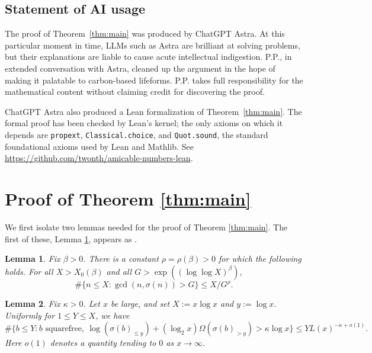 \documentclass[11pt]{amsart}
\newtheorem{lemma}{Lemma}
\begin{document}
\subsection*{Statement of AI usage} The proof of Theorem~\ref{thm:main} was produced by ChatGPT Astra.
At this particular moment in time, LLMs such as Astra are
brilliant at solving problems, but their explanations are liable to
cause acute intellectual indigestion. P.P., in extended conversation with
Astra, cleaned up the argument in the hope of making it
palatable to carbon-based lifeforms. P.P. takes full
responsibility for the mathematical content without claiming
credit for discovering the proof.

ChatGPT Astra also produced a Lean formalization of
Theorem~\ref{thm:main}. The formal proof has been checked by
Lean's kernel; the only axioms on which it depends are
\texttt{propext}, \texttt{Classical.choice}, and
\texttt{Quot.sound}, the standard foundational axioms used by
Lean and Mathlib. See
\url{https://github.com/twonth/amicable-numbers-lean}.
    \section{Proof of Theorem \ref{thm:main}}\label{sec:main-proof}
    
    We first isolate two lemmas needed for the proof of Theorem \ref{thm:main}. 
    The first of these, Lemma \ref{lem:pollack}, appears as \cite[Theorem 1.1]{Pollack2011}. 
    
    \begin{lemma}\label{lem:pollack}
    Fix $\beta>0$. There is a constant $\rho=\rho(\beta)>0$ for which the following holds. For all $X>X_0(\beta)$ and all $G>\exp((\log\log X)^\beta)$,
    \[
     \#\{n\le X:\gcd(n,\sigma(n))>G\}\le X/G^\rho.
    \]
    \end{lemma}
    

\begin{lemma}\label{lem:technical-A}
Fix $\kappa>0$. Let $x$ be large, and set $X:=x\log x$ and $y:=\log x$. Uniformly for $1\le Y\le X$, we have
\[
 \#\{b\le Y:b\text{ squarefree},\ 
 \log(\sigma(b)_{\le y})+(\log_2 x)\Omega(\sigma(b)_{>y})>\kappa\log x\}
 \le YL(x)^{-\kappa+o(1)}.
\]
Here $o(1)$ denotes a quantity tending to $0$ as $x\to\infty$.
\end{lemma}
\end{document}
